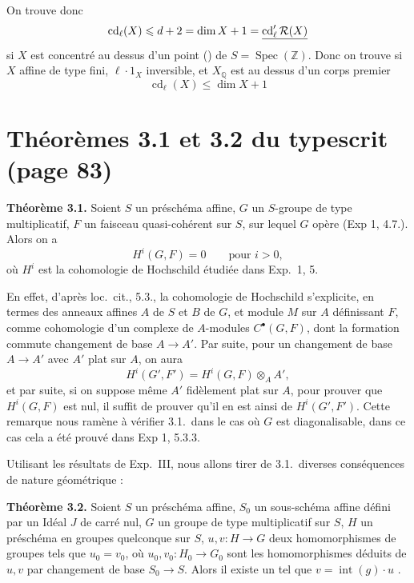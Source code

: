 \documentclass[11pt,a4paper]{article}
\begin{document}
On trouve donc
\[
\operatorname{cd}_{\ell}(X) \leqslant d + 2 = \dim X + 1 =
\uncertain{\operatorname{cd}'_{\ell} \mathcal{R}(X)}
\]
\ill{} \ill{} si $X$ est concentré \struck{\ill{}} au dessus d'un point
() de $S = \operatorname{Spec}(\mathbb{Z})$. Donc on trouve
\ill{} si $X$ affine de type fini, $\ell \cdot 1_{X}$ inversible, et \ill{}
$X_{\mathbb{Q}}$  est au dessus d'un corps 
 premier \ill{}
\[
\boxed{\operatorname{cd}_{\ell}(X) \leqslant \dim X + 1}
\]

\section*{Théorèmes 3.1 et 3.2 du typescrit (page 83)}


\textbf{Théorème 3.1.} Soient $S$ un préschéma affine, $G$ un $S$-groupe de
type multiplicatif, $F$ un faisceau quasi-cohérent sur $S$, sur lequel $G$
opère (Exp 1, 4.7.). Alors  on a
\[
H^{i}(G,F) = 0 \qquad \text{pour } i > 0,
\]
où $H^{i}$ est la cohomologie de Hochschild étudiée dans Exp.\ 1, 5.

En effet, d'après loc.\ cit., 5.3., la cohomologie de Hochschild s'explicite,
en termes des anneaux affines $A$ de $S$ et $B$ de $G$, et  module $M$
sur $A$ définissant $F$, comme cohomologie d'un complexe  de $A$-modules $C^{\bullet}(G,F)$, dont la formation commute 
changement de base $A \to A'$. Par suite, pour un changement de base
$A \to A'$ avec $A'$ plat sur $A$, on aura
\[
H^{i}(G',F') = H^{i}(G,F) \otimes_{A} A',
\]
et par suite, si on suppose même $A'$ fidèlement plat sur $A$, pour prouver que
$H^{i}(G,F)$ est nul, il suffit de prouver qu'il en est ainsi de
$H^{i}(G',F')$. Cette remarque nous ramène à vérifier 3.1.\ dans le cas où $G$
est diagonalisable, dans ce cas cela a été prouvé dans Exp 1, 5.3.3.

Utilisant les résultats de Exp.\ III, nous allons tirer de 3.1.\ diverses
conséquences de nature géométrique :

\textbf{Théorème 3.2.} Soient $S$ un préschéma affine, $S_{0}$ un sous-schéma
affine défini par un Idéal $J$ de carré nul, $G$ un groupe de type
multiplicatif sur $S$, $H$ un préschéma en groupes quelconque sur $S$,
$u, v : H \to G$ deux homomorphismes de groupes tels que $u_{0} = v_{0}$, où
$u_{0}, v_{0} : H_{0} \to G_{0}$ sont les homomorphismes déduits de $u, v$ par
changement de base $S_{0} \to S$. Alors il existe un  tel que
$v = \operatorname{int}(g) \cdot u$ .
\end{document}
